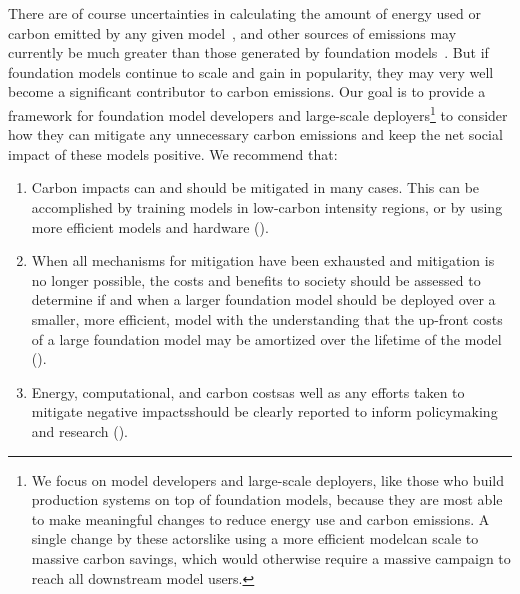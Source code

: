 There are of course uncertainties in calculating the amount of energy used or carbon emitted by any given model~\citep{henderson2020towards,cao2020towards,patterson2021carbon}, and other sources of emissions may currently be much greater than those generated by foundation models~\citep{mora2018bitcoin}. But if foundation models continue to scale and gain in popularity, they may very well become a significant contributor to carbon emissions. 
Our goal is to provide a framework for foundation model developers and large-scale deployers\footnote{We focus on model developers and large-scale deployers, like those who build production systems on top of foundation models, because they are most able to make meaningful changes to reduce energy use and carbon emissions. A single change by these actors\dash{}like using a more efficient model\dash{}can scale to massive carbon savings, which would otherwise require a massive campaign to reach all downstream model users.} to consider how they can mitigate any unnecessary carbon emissions and keep the net social impact of these models positive.
We recommend that: 
\begin{enumerate}
    \item Carbon impacts can and should be mitigated in many cases. This can be accomplished by training models in low-carbon intensity regions,
    or by using more efficient models and hardware ().
    \item When all mechanisms for mitigation have been exhausted and mitigation is no longer possible, 
    the costs and benefits to society should be assessed 
    to determine if and when a larger foundation model should be deployed over a smaller, more efficient, model 
   \dash{}with the understanding that the up-front costs of a large foundation model may be amortized over the lifetime of the model ().
    \item Energy, computational, and carbon costs\dash{}as well as any efforts taken to mitigate negative impacts\dash{}should be clearly reported to inform policymaking and research ().
\end{enumerate}

